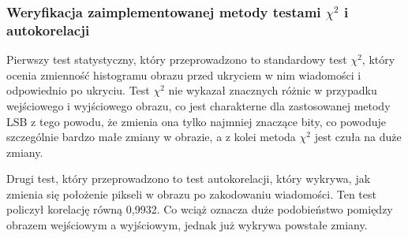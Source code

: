 \subsubsection{Weryfikacja zaimplementowanej metody testami $\chi^{2}$ i autokorelacji}

Pierwszy test statystyczny, który przeprowadzono to standardowy test $\chi^{2}$, który ocenia zmienność histogramu obrazu przed ukryciem w nim wiadomości i odpowiednio po ukryciu.
\noindent
\newline
\newline
Test $\chi^{2}$ nie wykazał znacznych różnic w przypadku wejściowego i wyjściowego obrazu, co jest charakterne dla zastosowanej metody LSB z tego powodu, że zmienia ona tylko najmniej znaczące bity, co powoduje szczególnie bardzo małe zmiany w obrazie, a z kolei metoda $\chi^{2}$ jest czuła na duże zmiany.

Drugi test, który przeprowadzono to test autokorelacji, który wykrywa, jak zmienia się położenie pikseli w obrazu po zakodowaniu wiadomości.  Ten test policzył korelację równą 0,9932. Co wciąż oznacza duże podobieństwo pomiędzy obrazem wejściowym a wyjściowym, jednak już wykrywa powstałe zmiany.
